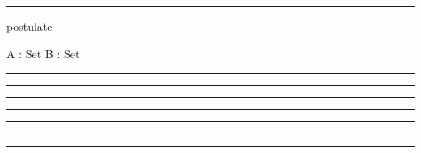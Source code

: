\documentclass{article}
\begin{document}
\hrule
\begin{code}
postulate
  
  A : Set  
  B : Set  
\end{code}
\hrule
\begin{code}
  
\end{code}
\hrule
\begin{code}

\end{code}
\hrule
\begin{code}
\end{code}
\hrule
\begin{code}  
  \end{code}
\hrule
  \begin{code}  
\end{code}
\hrule
  \begin{code}  
    \end{code}
\hrule
\end{document}
